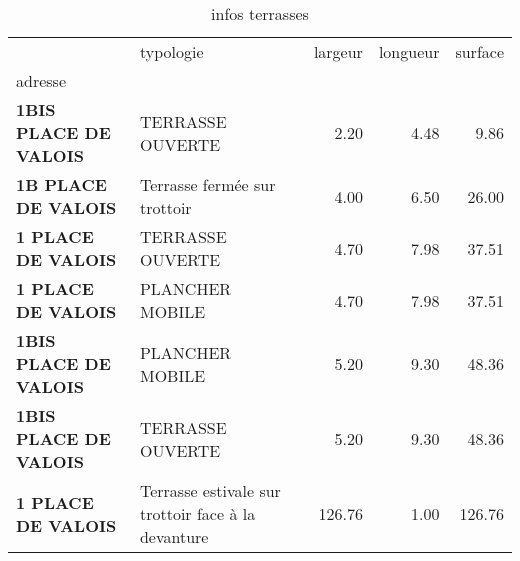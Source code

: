 \documentclass{beamer}
\begin{document}
\begin{frame}
	\begin{table}[c]
		\caption{infos terrasses}
		\label{tab: infos terrasses}
		\begin{tabular}{llrrr}
			\toprule
			                              & typologie                                          & largeur & longueur & surface \\
			adresse                       &                                                    &         &          &         \\
			\midrule
			\textbf{1BIS PLACE DE VALOIS} & TERRASSE OUVERTE                                   & 2.20    & 4.48     & 9.86    \\
			\textbf{1B PLACE DE VALOIS}   & Terrasse fermée sur trottoir                       & 4.00    & 6.50     & 26.00   \\
			\textbf{1 PLACE DE VALOIS}    & TERRASSE OUVERTE                                   & 4.70    & 7.98     & 37.51   \\
			\textbf{1 PLACE DE VALOIS}    & PLANCHER MOBILE                                    & 4.70    & 7.98     & 37.51   \\
			\textbf{1BIS PLACE DE VALOIS} & PLANCHER MOBILE                                    & 5.20    & 9.30     & 48.36   \\
			\textbf{1BIS PLACE DE VALOIS} & TERRASSE OUVERTE                                   & 5.20    & 9.30     & 48.36   \\
			\textbf{1 PLACE DE VALOIS}    & Terrasse estivale sur trottoir face à la devanture & 126.76  & 1.00     & 126.76  \\
			\bottomrule
		\end{tabular}
	\end{table}


\end{frame}
\end{document}
